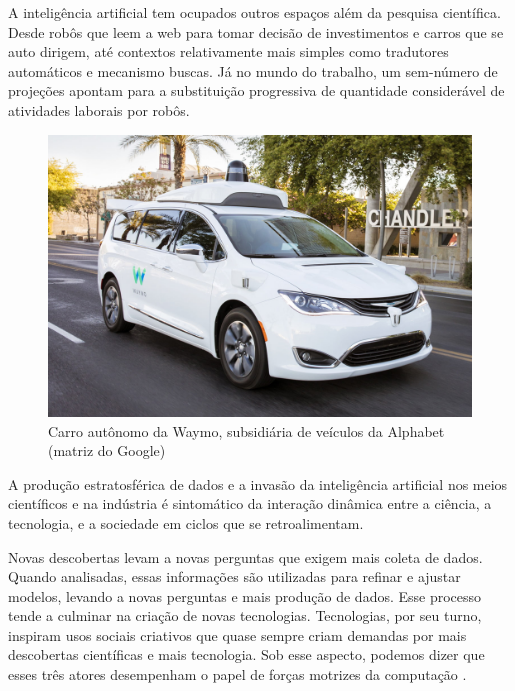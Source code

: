 A inteligência artificial tem ocupados outros espaços além da pesquisa científica. Desde robôs que leem a web para tomar decisão de investimentos \cite[]{Bloomberg} e carros que se auto dirigem, até contextos relativamente mais simples como tradutores automáticos e mecanismo buscas. Já no mundo do trabalho, um sem-número de projeções apontam para a substituição progressiva de quantidade considerável de atividades laborais por robôs.


\begin{figure}[htb]
	\begin{center}
	    \includegraphics[scale=0.25]{imagens/waymo}
	\end{center}
	\caption{\label{Waymo} Carro autônomo da Waymo, subsidiária de veículos da Alphabet (matriz do Google)}
\end{figure}

A produção estratosférica de dados e a invasão da inteligência artificial nos meios científicos e na indústria é sintomático da interação dinâmica entre a ciência, a tecnologia, e a sociedade em ciclos que se retroalimentam.

Novas descobertas levam a novas perguntas que exigem mais coleta de dados. Quando analisadas, essas informações são utilizadas para refinar e ajustar modelos, levando a novas perguntas e mais produção de dados. Esse processo tende a culminar na criação de novas tecnologias. Tecnologias, por seu turno, inspiram usos sociais criativos que quase sempre criam demandas por mais descobertas científicas e mais tecnologia. Sob esse aspecto, podemos dizer que esses três atores desempenham o papel de forças motrizes da computação \cite[]{wing2008}. 

